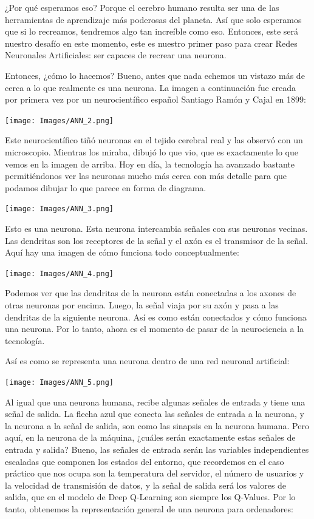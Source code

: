 \documentclass[
]{book}
\begin{document}
¿Por qué esperamos eso? Porque el cerebro humano resulta ser una de las herramientas de aprendizaje más poderosas del planeta. Así que solo esperamos que si lo recreamos, tendremos algo tan increíble como eso. Entonces, este será nuestro desafío en este momento, este es nuestro primer paso para crear Redes Neuronales Artificiales: ser capaces de recrear una neurona.

Entonces, ¿cómo lo hacemos? Bueno, antes que nada echemos un vistazo más de cerca a lo que realmente es una neurona. La imagen a continuación fue creada por primera vez por un neurocientífico español Santiago Ramón y Cajal en 1899:

\texttt{[image: Images/ANN\_2.png]}

Este neurocientífico tiñó neuronas en el tejido cerebral real y las observó con un microscopio. Mientras los miraba, dibujó lo que vio, que es exactamente lo que vemos en la imagen de arriba. Hoy en día, la tecnología ha avanzado bastante permitiéndonos ver las neuronas mucho más cerca con más detalle para que podamos dibujar lo que parece en forma de diagrama.

\texttt{[image: Images/ANN\_3.png]}

Esto es una neurona. Esta neurona intercambia señales con sus neuronas vecinas. Las dendritas son los receptores de la señal y el axón es el transmisor de la señal. Aquí hay una imagen de cómo funciona todo conceptualmente:

\texttt{[image: Images/ANN\_4.png]}

Podemos ver que las dendritas de la neurona están conectadas a los axones de otras neuronas por encima. Luego, la señal viaja por su axón y pasa a las dendritas de la siguiente neurona. Así es como están conectados y cómo funciona una neurona. Por lo tanto, ahora es el momento de pasar de la neurociencia a la tecnología.

Así es como se representa una neurona dentro de una red neuronal artificial:

\texttt{[image: Images/ANN\_5.png]}

Al igual que una neurona humana, recibe algunas señales de entrada y tiene una señal de salida. La flecha azul que conecta las señales de entrada a la neurona, y la neurona a la señal de salida, son como las sinapsis en la neurona humana. Pero aquí, en la neurona de la máquina, ¿cuáles serán exactamente estas señales de entrada y salida? Bueno, las señales de entrada serán las variables independientes escaladas que componen los estados del entorno, que recordemos en el caso práctico que nos ocupa son la temperatura del servidor, el número de usuarios y la velocidad de transmisión de datos, y la señal de salida será los valores de salida, que en el modelo de Deep Q-Learning son siempre los Q-Values. Por lo tanto, obtenemos la representación general de una neurona para ordenadores:
\end{document}
